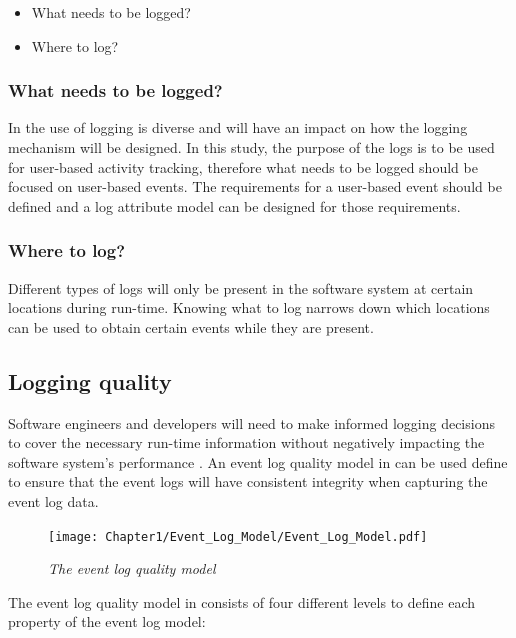 \begin{itemize}
	\item What needs to be logged?
	\item Where to log?
\end{itemize}

\subsubsection{What needs to be logged?}
In  the use of logging is diverse and will have an impact on how the logging mechanism will be designed. In this study, the purpose of the logs is to be used for user-based activity tracking, therefore what needs to be logged should be focused on user-based events. The requirements for a user-based event should be defined and a log attribute model can be designed for those requirements.

\subsubsection{Where to log?}
Different types of logs will only be present in the software system at certain locations during run-time. Knowing what to log narrows down which locations can be used to obtain certain events while they are present.

\clearpage

\subsection{Logging quality}\label{sec:ch1_loggingQuality}

Software engineers and developers will need to make informed logging decisions to cover the necessary run-time information without negatively impacting the software system's performance \cite{Zhu2015, Zhu2019, Kherbouche2017}. An event log quality model in  can be used define to ensure that the event logs will have consistent integrity when capturing the event log data.

\begin{figure}[!htb] %
	\centering %
	\texttt{[image: Chapter1/Event\_Log\_Model/Event\_Log\_Model.pdf]}
	\caption[The event log quality model]
	{\textit{The event log quality model \cite{Kherbouche2017}}} \label{fig:ch1_EventQModel}
\end{figure}

The event log quality model in  consists of four different levels to define each property of the event log model:

